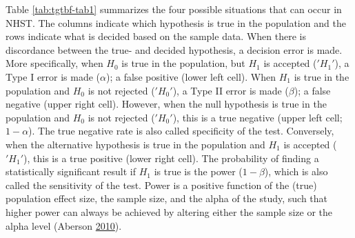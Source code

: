 \documentclass[a5paper]{book}
\begin{document}
Table \ref{tab:tgtbf-tab1} summarizes the four possible situations that
can occur in NHST. The columns indicate which hypothesis is true in the
population and the rows indicate what is decided based on the sample
data. When there is discordance between the true- and decided
hypothesis, a decision error is made. More specifically, when \(H_0\) is
true in the population, but \(H_1\) is accepted (\('H_1'\)), a Type I
error is made (\(\alpha\)); a false positive (lower left cell). When
\(H_1\) is true in the population and \(H_0\) is not rejected
(\('H_0'\)), a Type II error is made (\(\beta\)); a false negative
(upper right cell). However, when the null hypothesis is true in the
population and \(H_0\) is not rejected (\('H_0'\)), this is a true
negative (upper left cell; \(1-\alpha\)). The true negative rate is also
called specificity of the test. Conversely, when the alternative
hypothesis is true in the population and \(H_1\) is accepted
(\('H_1'\)), this is a true positive (lower right cell). The probability
of finding a statistically significant result if \(H_1\) is true is the
power (\(1-\beta\)), which is also called the sensitivity of the test.
Power is a positive function of the (true) population effect size, the
sample size, and the alpha of the study, such that higher power can
always be achieved by altering either the sample size or the alpha level
(Aberson \protect\hyperlink{ref-Aberson2010-xa}{2010}).

\begin{table}[!h]

\caption{\label{tab:tgtbf-tab1}Summary table of possible NHST results. Columns indicate the true situation in the population, rows indicate the decision based on a statistical test. The true positive probability is also called power and sensitivity, whereas the true negative rate is also called specificity.}
\centering
{}
\end{table}
\end{document}
